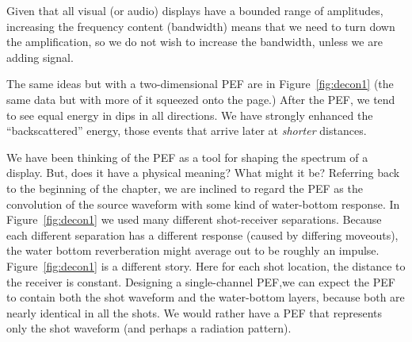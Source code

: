 
\par
Given that all visual (or audio) displays have a bounded range
of amplitudes, increasing the frequency content (bandwidth)
means that we need to turn down the amplification,
so we do not wish to increase the bandwidth, unless we are adding signal.

\par
{}

\par
The same ideas but with a two-dimensional PEF are in
Figure~\ref{fig:decon1} (the same data but with more of
it squeezed onto the page.)
After the PEF, we tend to see equal energy in dips in all directions.
We have strongly enhanced the ``backscattered'' energy,
those events that arrive later at {\it shorter} distances.

\par
We have been thinking of the PEF as a tool
for shaping the spectrum of a display.
But, does it have a physical meaning?
What might it be?
Referring back to the beginning of the chapter, we are inclined to
regard the PEF as the convolution of the source waveform with
some kind of water-bottom response.
In Figure~\ref{fig:decon1} we used many different shot-receiver
separations.  Because each different separation has a different
response (caused by differing moveouts), the water bottom reverberation
might average out to be roughly an impulse.
Figure~\ref{fig:decon1} is a different story.
Here for each shot location, the distance to the receiver is constant.
Designing a single-channel PEF,we can expect the PEF to contain
both the shot waveform and the water-bottom layers, because
both are nearly identical in all the shots.
We would rather have a PEF that represents only the shot waveform
(and perhaps a radiation pattern).

